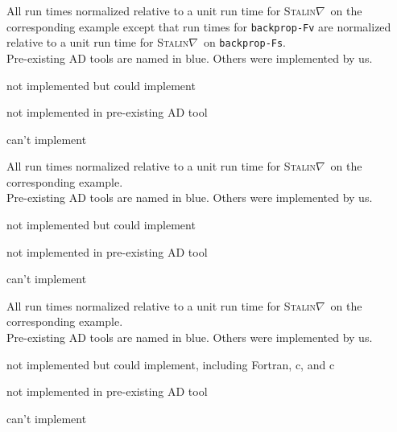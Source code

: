 \documentclass{article}
\newcommand{\red}{\color{Red}}
\newcommand{\green}{\color{Green}}
\newcommand{\blue}{\color{Blue}}
\newcommand{\Stalingrad}{\textsc{Stalin$\nabla$}}
\newcommand{\Fortran}{{\mbox{\sc Fortran}}}
\newcommand{\Clang}{{\mbox{\sc c}}}
\newcommand{\Cplusplus}{{\mbox{\sc c\symbol{43}\symbol{43}}}}
\begin{document}
\begin{center}
\resizebox{\linewidth}{!}{}
\end{center}
All run times normalized relative to a unit run time for \Stalingrad\ on
the corresponding example except that run times for \texttt{backprop-Fv}
are normalized relative to a unit run time for \Stalingrad\ on
\texttt{backprop-Fs}.\\
Pre-existing AD tools are named in {\blue blue}.
Others were implemented by us.
\begin{compactdesc}
\item[{\green\rule{1ex}{1ex}}] not implemented but could implement
\item[{\blue\rule{1ex}{1ex}}] not implemented in pre-existing AD tool
\item[{\red\rule{1ex}{1ex}}] can't implement
\end{compactdesc}
\newpage
\begin{center}
\resizebox{\linewidth}{!}{}
\end{center}
All run times normalized relative to a unit run time for \Stalingrad\ on
the corresponding example.\\
Pre-existing AD tools are named in {\blue blue}.
Others were implemented by us.
\begin{compactdesc}
\item[{\green\rule{1ex}{1ex}}] not implemented but could implement
\item[{\blue\rule{1ex}{1ex}}] not implemented in pre-existing AD tool
\item[{\red\rule{1ex}{1ex}}] can't implement
\end{compactdesc}
\newpage
\begin{center}
\resizebox{\linewidth}{!}{}
\end{center}
All run times normalized relative to a unit run time for \Stalingrad\ on
the corresponding example.\\
Pre-existing AD tools are named in {\blue blue}.
Others were implemented by us.
\begin{compactdesc}
\item[{\green\rule{1ex}{1ex}}] not implemented but could implement,
including \Fortran, \Clang, and \Cplusplus
\item[{\blue\rule{1ex}{1ex}}] not implemented in pre-existing AD tool
\item[{\red\rule{1ex}{1ex}}] can't implement
\end{compactdesc}
\newpage
\begin{center}
\resizebox{0.8\linewidth}{!}{}
\end{center}
\end{document}
